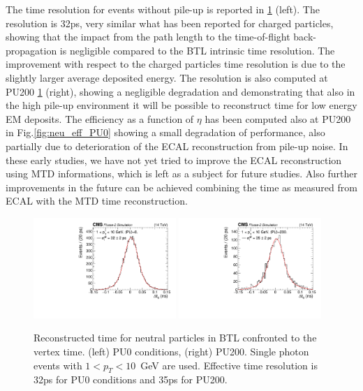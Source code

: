 The time resolution for events without pile-up is reported in \ref{fig:neu_tres} (left). The resolution is 32ps, very similar what has been reported for charged particles, showing that the impact from the path length to the time-of-flight back-propagation is negligible compared to the BTL intrinsic time resolution. The improvement with respect to the charged particles time resolution is due to the slightly larger average deposited energy. The resolution is also computed at PU200 \ref{fig:neu_tres} (right), showing a negligible degradation and demonstrating that also in the high pile-up environment it will be possible to reconstruct time for low energy EM deposits. The efficiency as a function of $\eta$ has been computed also at PU200 in Fig.\ref{fig:neu_eff_PU0} showing a small degradation of performance, also partially due to deterioration of the ECAL reconstruction from pile-up noise. In these early studies, we have not yet tried to improve the ECAL reconstruction using MTD informations, which is left as a subject for future studies. Also further improvements in the future can be achieved combining the time as measured from ECAL with the MTD time reconstruction.

\begin{figure}[!hbtp]
\centering
\includegraphics[width=0.48\textwidth]{fig/performance/neutrals/t0_resolution_simhtof_0PU.pdf}
\includegraphics[width=0.48\textwidth]{fig/performance/neutrals/t0_resolution_simhtof_200PU.pdf}
\caption{Reconstructed time for neutral particles in BTL confronted to the vertex time. (left) PU0 conditions, (right) PU200. Single photon events with $1<p_{T}<10$~GeV are used. Effective time resolution is 32ps for PU0 conditions and 35ps for PU200.}
\label{fig:neu_tres}
\end{figure}

